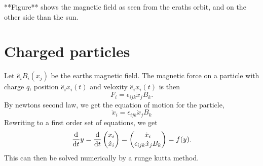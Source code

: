 \documentclass{article}
\begin{document}
        **Figure** shows the magnetic field as seen from the eraths orbit, and on the other side than the sun. 
    \section*{Charged particles}
        Let $ \hat e_i B_i(x_j)$ be the earths magnetic field. The magnetic force on a particle with charge $q$, position $\hat e_i x_i(t)$ and veloxity $\hat e_i \dot x_i (t)$ is then
        \begin{equation}
            F_i = \epsilon_{ijk} \dot x_j B_k.
        \end{equation}
        By newtons second law, we get the equation of motion for the particle,
        \begin{equation}
            \ddot x_i = \epsilon_{ijk} \dot x_j B_k
        \end{equation}
        Rewriting to a first order set of equations, we get
        \begin{align*}
            \dv{t} y = \dv{t} 
            \begin{pmatrix}
                x_i \\
                \dot x_i
            \end{pmatrix}
            = 
            \begin{pmatrix}
                \dot x_i \\
                \epsilon_{ijk} \dot x_j B_k
            \end{pmatrix}
            = f(y).
        \end{align*}
        This can then be solved numerically by a runge kutta method.
\end{document}
